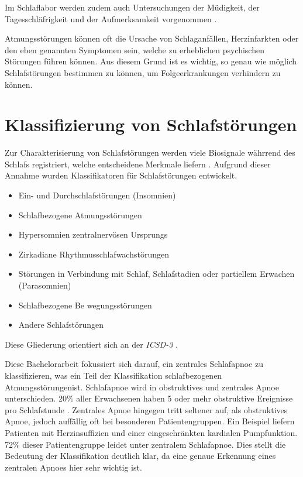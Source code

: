 Im Schlaflabor werden zudem auch Untersuchungen der Müdigkeit, der Tagesschläfrigkeit und der Aufmerksamkeit vorgenommen \cite{schlafmedizin_1x1}.

Atmungsstörungen können oft die Ursache von Schlaganfällen, Herzinfarkten oder den eben genannten Symptomen sein, welche zu erheblichen psychischen Störungen führen können.
Aus diesem Grund ist es wichtig, so genau wie möglich Schlafstörungen bestimmen zu können, um Folgeerkrankungen verhindern zu können. 

\section{Klassifizierung von Schlafstörungen}
Zur Charakterisierung von Schlafstörungen werden viele Biosignale währrend des Schlafs registriert, welche entscheidene Merkmale liefern \cite{praxis_der_schlafmedizin}.
Aufgrund dieser Annahme wurden Klassifikatoren für Schlafstörungen entwickelt.
\begin{itemize}
    \item Ein- und Durchschlafstörungen (Insomnien)
    \item Schlafbezogene Atmungsstörungen
    \item Hypersomnien zentralnervösen Ursprungs
    \item Zirkadiane Rhythmusschlafwachstörungen
    \item Störungen in Verbindung mit Schlaf, Schlafstadien oder partiellem Erwachen (Parasomnien)
    \item Schlafbezogene Be wegungsstörungen
    \item Andere Schlafstörungen
\end{itemize}

Diese Gliederung orientiert sich an der \textit{ICSD-3} \cite{praxis_der_schlafmedizin}.


Diese Bachelorarbeit fokussiert sich darauf, ein zentrales Schlafapnoe zu klassifizieren, was ein Teil der Klassifikation \glqq schlafbezogenen Atmungsstörungen\grqq ist.
Schlafapnoe wird in obstruktives und zentrales Apnoe unterschieden. 
20\% aller Erwachsenen haben 5 oder mehr obstruktive Ereignisse pro Schlafstunde \cite{schlafmedizin_1x1}.
Zentrales Apnoe hingegen tritt seltener auf, als obstruktives Apnoe, jedoch auffällig oft bei besonderen Patientengruppen. 
Ein Beispiel liefern Patienten mit Herzinsuffizien und einer eingeschränkten kardialen Pumpfunktion.
72\% dieser Patientengruppe leidet unter zentralem Schlafapnoe. Dies stellt die Bedeutung der Klassifikation deutlich klar, da eine genaue Erkennung eines zentralen Apnoes hier sehr wichtig ist.

